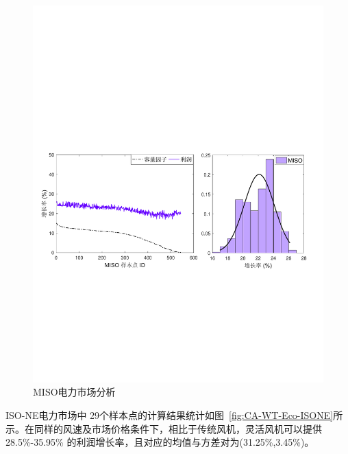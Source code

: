 \begin{figure}[H] %
  \centering
  \includegraphics[scale=0.70]{figures/Chap5-17-CA-WT-Eco-MISO.pdf}
  \caption{MISO电力市场分析}
  \label{fig:CA-WT-Eco-MISO}
\end{figure}

ISO-NE电力市场中 29个样本点的计算结果统计如图~\ref{fig:CA-WT-Eco-ISONE}所示。在同样的风速及市场价格条件下，相比于传统风机，灵活风机可以提供 28.5\%-35.95\% 的利润增长率，且对应的均值与方差对为(31.25\%,3.45\%)。

